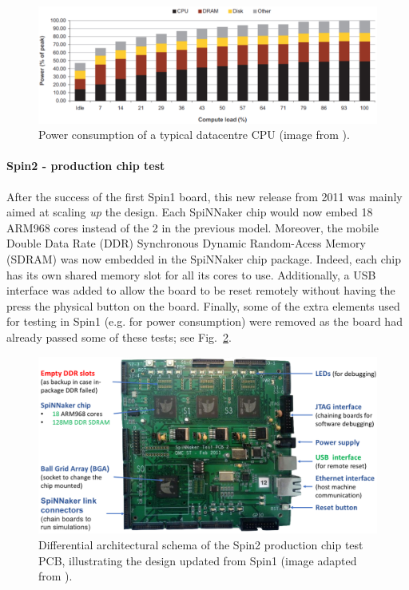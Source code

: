 \begin{figure}[!ht]
\centering
\includegraphics[width = 1\hsize]{figures/energy-non-prop.png}
\caption{Power consumption of a typical datacentre CPU (image from \cite{energy-non-prop}).}
\label{fig:energy-non-prop}
\end{figure}


\paragraph{Spin2 - production chip test}
 
After the success of the first Spin1 board, this new release from 2011 was mainly aimed at scaling \textit{up} the design. Each SpiNNaker chip would now embed 18 ARM968 cores instead of the 2 in the previous model. Moreover, the mobile Double Data Rate (DDR) Synchronous Dynamic Random-Acess Memory (SDRAM) was now embedded in the SpiNNaker chip package. Indeed, each chip has its own shared memory slot for all its cores to use. Additionally, a USB interface was added to allow the board to be reset remotely without having the press the physical button on the board. Finally, some of the extra elements used for testing in Spin1 (e.g. for power consumption) were removed as the board had already passed some of these tests; see Fig.~\ref{fig:spin2}.


\begin{figure}[!ht]
\centering
\includegraphics[width=\textwidth]{figures/spin2-schema.png}
\caption{Differential architectural schema of the Spin2 production chip test PCB, illustrating the design updated from Spin1 (image adapted from \cite{dev-process}).}
\label{fig:spin2}
\end{figure} 

